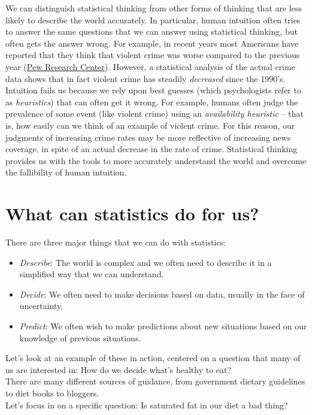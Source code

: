 \documentclass[]{book}
\providecommand{\tightlist}{%
  \setlength{\itemsep}{0pt}\setlength{\parskip}{0pt}}
\theoremstyle{definition}
\theoremstyle{definition}
\theoremstyle{definition}
\theoremstyle{remark}
\begin{document}
We can distinguish statistical thinking from other forms of thinking
that are less likely to describe the world accurately. In particular,
human intuition often tries to answer the same questions that we can
answer using statistical thinking, but often gets the answer wrong. For
example, in recent years most Americans have reported that they think
that violent crime was worse compared to the previous year
(\href{http://www.pewresearch.org/fact-tank/2018/01/30/5-facts-about-crime-in-the-u-s/}{Pew
Research Center}). However, a statistical analysis of the actual crime
data shows that in fact violent crime has steadily \emph{decreased}
since the 1990's. Intuition fails us because we rely upon best guesses
(which psychologists refer to as \emph{heuristics}) that can often get
it wrong. For example, humans often judge the prevalence of some event
(like violent crime) using an \emph{availability heuristic} -- that is,
how easily can we think of an example of violent crime. For this reason,
our judgments of increasing crime rates may be more reflective of
increasing news coverage, in spite of an actual decrease in the rate of
crime. Statistical thinking provides us with the tools to more
accurately understand the world and overcome the fallibility of human
intuition.

\section{What can statistics do for
us?}\label{what-can-statistics-do-for-us}

There are three major things that we can do with statistics:

\begin{itemize}
\tightlist
\item
  \emph{Describe}: The world is complex and we often need to describe it
  in a simplified way that we can understand.\\
\item
  \emph{Decide}: We often need to make decisions based on data, usually
  in the face of uncertainty.
\item
  \emph{Predict}: We often wish to make predictions about new situations
  based on our knowledge of previous situations.
\end{itemize}

Let's look at an example of these in action, centered on a question that
many of us are interested in: How do we decide what's healthy to eat?\\
There are many different sources of guidance, from government dietary
guidelines to diet books to bloggers.\\
Let's focus in on a specific question: Is saturated fat in our diet a
bad thing?
\end{document}
